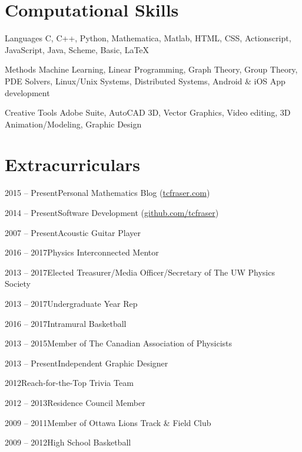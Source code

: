 \documentclass{article}
\begin{document}
    \section{Computational Skills}
    \begin{computerlist}
        \item{Languages}
             {C, C++, Python, Mathematica, Matlab, HTML, CSS, Actionscript, JavaScript, Java, Scheme, Basic, LaTeX}
        \item{Methods}
             {Machine Learning, Linear Programming, Graph Theory, Group Theory, PDE Solvers, Linux/Unix Systems, Distributed Systems, Android \& iOS App development}
        \item{Creative Tools}
             {Adobe Suite, AutoCAD 3D, Vector Graphics, Video editing, 3D Animation/Modeling, Graphic Design}
    \end{computerlist}
    \section{Extracurriculars}
    \begin{extralist}
        \item{2015 -- Present}{Personal Mathematics Blog (\href{http://tcfraser.com/}{tcfraser.com})}
        \item{2014 -- Present}{Software Development (\href{https://github.com/tcfraser}{github.com/tcfraser})}
        \item{2007 -- Present}{Acoustic Guitar Player}
        \item{2016 -- 2017}{Physics Interconnected Mentor}
        \item{2013 -- 2017}{Elected Treasurer/Media Officer/Secretary of The UW Physics Society}
        \item{2013 -- 2017}{Undergraduate Year Rep}
        \item{2016 -- 2017}{Intramural Basketball}
        \item{2013 -- 2015}{Member of The Canadian Association of Physicists}
        \item{2013 -- Present}{Independent Graphic Designer}
        \item{2012}{Reach-for-the-Top Trivia Team}
        \item{2012 -- 2013}{Residence Council Member}
        \item{2009 -- 2011}{Member of Ottawa Lions Track \& Field Club}
        \item{2009 -- 2012}{High School Basketball}
    \end{extralist}
    \latestrevisionfooter
\end{document}
